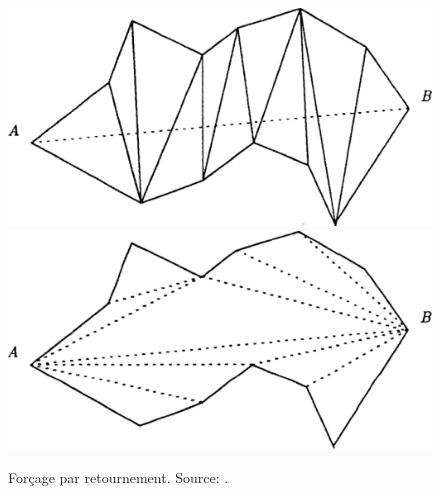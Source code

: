\begin{figure}[h!]
\centering
\includegraphics[scale=0.275]{images/retourn_arete_george-1.pdf}\hfill
\includegraphics[scale=0.275]{images/retourn_arete_george-2.pdf}
\caption{Forçage par retournement. Source: \cite{georgegeneration}.}
\label{fig:retournement_arete_george}
\end{figure}

